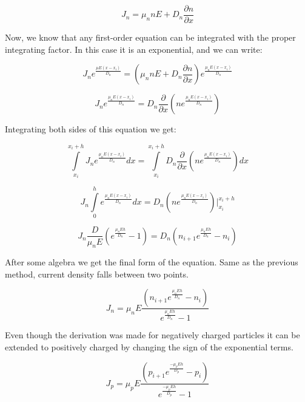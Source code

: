 \begin{equation}
J_n=\mu_n n E+ D_n \frac{\partial n}{\partial x}
\end{equation}

Now, we know that any first-order equation can be integrated with the
proper integrating factor. In this case it is an exponential, and we can
write:

\begin{equation}
J_n e^{\frac{\mu E (x-x_i)}{D_n}}=(\mu_n n E+ D_n \frac{\partial n}{\partial x})e^{\frac{\mu_n E (x-x_i)}{D_n}}
\end{equation}

\begin{equation}
J_n e^{\frac{\mu_n E (x-x_i)}{D_n}}=D_n \frac{\partial }{\partial x}(ne^{\frac{\mu_n E (x-x_i)}{D_n}})
\end{equation}

Integrating both sides of this equation we get:

\begin{equation}\nonumber
\int\limits_{x_i}^{x_i+h}J_n e^{\frac{\mu_n E (x-x_i)}{D_n}}dx=\int\limits_{x_i}^{x_i+h}D_n \frac{\partial }{\partial x}(ne^{\frac{\mu_n E (x-x_i)}{D_n}})dx
\end{equation}

\begin{equation}\nonumber
J_n\int\limits_{0}^{h} e^{\frac{\mu_n E (x-x_i)}{D_n}}dx=D_n (ne^{\frac{\mu_n E (x-x_i)}{D_n}})|^{x_i+h}_{x_i}
\end{equation}

\begin{equation}\nonumber
J_n\frac{D}{\mu_n E}(e^{\frac{\mu_n E h}{D_n}}-1)=D_n (n_{i+1}e^{\frac{\mu_n E h}{D_n}}-n_i)
\end{equation}

After some algebra we get the final form of the equation. Same as the previous method, current density falls between two points.

\begin{equation}
J_n =\mu_n E\frac{(n_{i+1}e^{\frac{\mu_n E h}{D_n}}-n_i)}{e^{\frac{\mu_n E h}{D_n}}-1}
\end{equation}

Even though the derivation was made for negatively charged particles it can be extended to positively charged by changing the sign of the exponential terms.

\begin{equation}
J_p =\mu_p E\frac{(p_{i+1}e^{\frac{-\mu_p E h}{D_p}}-p_i)}{e^{\frac{-\mu_p E h}{D_p}}-1}
\end{equation}


